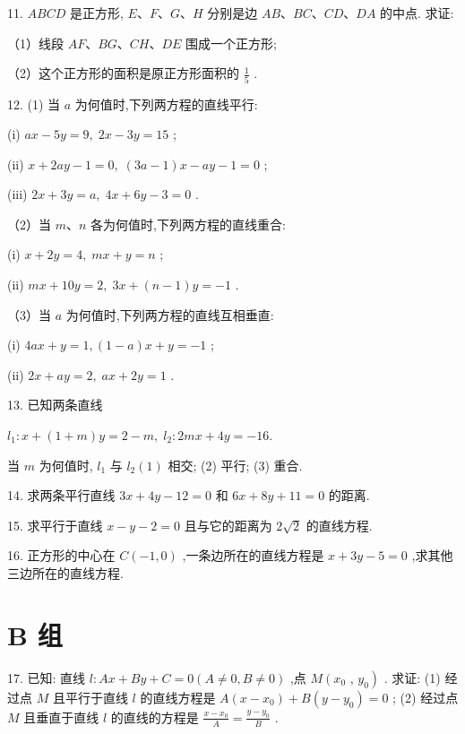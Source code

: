 \documentclass[lang=cn,newtx,10pt,scheme=chinese]{elegantbook}
\begin{document}
11. \({ABCD}\) 是正方形, \(E\text{、}F\text{、}G\text{、}H\) 分别是边 \({AB}\text{、}{BC}\text{、}{CD}\text{、}{DA}\) 的中点. 求证:

（1）线段 \({AF}\text{、}{BG}\text{、}{CH}\text{、}{DE}\) 围成一个正方形;

（2）这个正方形的面积是原正方形面积的 \(\frac{1}{5}\) .

12. (1) 当 \(a\) 为何值时,下列两方程的直线平行:

(i) \({ax} - {5y} = 9,\;{2x} - {3y} = {15}\) ;

(ii) \(x + {2ay} - 1 = 0,\;\left( {{3a} - 1}\right) x - {ay} - 1 = 0\) ;

(iii) \({2x} + {3y} = a,\;{4x} + {6y} - 3 = 0\) .

（2）当 \(m\text{、}n\) 各为何值时,下列两方程的直线重合:

(i) \(x + {2y} = 4,\;{mx} + y = n\) ;

(ii) \({mx} + {10y} = 2,\;{3x} + \left( {n - 1}\right) y = - 1\) .

（3）当 \(a\) 为何值时,下列两方程的直线互相垂直:

(i) \({4ax} + y = 1,\left( {1 - a}\right) x + y = - 1\) ;

(ii) \({2x} + {ay} = 2,\;{ax} + {2y} = 1\) .

13. 已知两条直线

\({l}_{1} : x + \left( {1 + m}\right) y = 2 - m,\;{l}_{2} : {2mx} + {4y} = - {16}.\)

当 \(m\) 为何值时, \({l}_{1}\) 与 \({l}_{2}\left( 1\right)\) 相交; (2) 平行; (3) 重合.

14. 求两条平行直线 \({3x} + {4y} - {12} = 0\) 和 \({6x} + {8y} + {11} = 0\) 的距离.

15. 求平行于直线 \(x - y - 2 = 0\) 且与它的距离为 \(2\sqrt{2}\) 的直线方程.

16. 正方形的中心在 \(C\left( {-1,0}\right)\) ,一条边所在的直线方程是 \(x + {3y} - 5 = 0\) ,求其他三边所在的直线方程.

\section*{B 组}

17. 已知: 直线 \(l : {Ax} + {By} + C = 0\left( {A \neq 0,B \neq 0}\right)\) ,点 \(M\left( {x}_{0}\right.\) , \(\left. {y}_{0}\right)\) . 求证: (1) 经过点 \(M\) 且平行于直线 \(l\) 的直线方程是 \(A\left( {x - {x}_{0}}\right) + B\left( {y - {y}_{0}}\right) = 0\) ; (2) 经过点 \(M\) 且垂直于直线 \(l\) 的直线的方程是 \(\frac{x - {x}_{0}}{A} = \frac{y - {y}_{0}}{B}\) .
\end{document}
